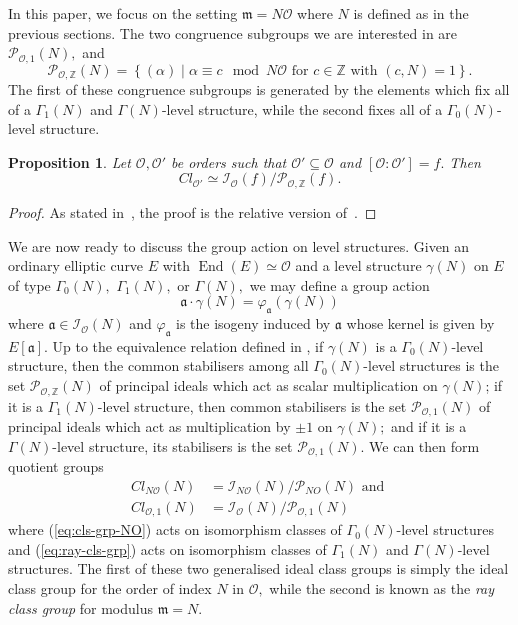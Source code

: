 \documentclass[11pt,a4paper]{amsart}
\theoremstyle{plain}
\newtheorem{prop}[thm]{Proposition}
\theoremstyle{definition}
\theoremstyle{remark}
\DeclareMathOperator{\Endo}{End}
\begin{document}
In this paper, we focus on the setting $\mathfrak{m} = N\mathcal{O}$ where $N$ is defined as in the previous sections. The two congruence subgroups we are interested in are $\mathcal{P}_{\mathcal{O},1}(N),$ and
\[
\mathcal{P}_{\mathcal{O},\mathbb{Z}}(N) = \left\{ (\alpha) \mid \alpha \equiv c \mod N\mathcal{O} \text{ for } c \in \mathbb{Z} \text{ with } (c, N) = 1 \right\}.
\]
The first of these congruence subgroups is generated by the elements which fix all of a $\Gamma_1(N)$ and $\Gamma(N)$-level structure, while the second fixes all of a $\Gamma_0(N)$-level structure.

\begin{prop}\label{prop:cong-subgroup-integers}
  Let $\mathcal{O}, \mathcal{O}'$ be orders such that $\mathcal{O}' \subseteq \mathcal{O}$ and $[\mathcal{O}:\mathcal{O}'] = f.$ Then
  \[
    Cl_{\mathcal{O}'} \simeq \mathcal{I}_{\mathcal{O}}(f)/\mathcal{P}_{\mathcal{O},\mathbb{Z}}(f).
  \]
\end{prop}
\begin{proof}
  As stated in~\cite[Thm.~2.3.1]{class-group-action-oriented}, the proof is the relative version of~\cite[Prop.~7.22]{cox}.
\end{proof}

We are now ready to discuss the group action on level structures. Given an ordinary elliptic curve $E$ with $\Endo(E) \simeq \mathcal{O}$ and a level structure $\gamma(N)$ on $E$ of type $\Gamma_0(N),$ $\Gamma_1(N),$ or $\Gamma(N),$ we may define a group action
\[
  \mathfrak{a} \cdot \gamma(N) = \varphi_{\mathfrak{a}}(\gamma(N))
\]
where $\mathfrak{a} \in \mathcal{I}_{\mathcal{O}}(N)$ and $\varphi_{\mathfrak{a}}$ is the isogeny induced by $\mathfrak{a}$ whose kernel is given by $E[\mathfrak{a}].$ Up to the equivalence relation defined in , if $\gamma(N)$ is a $\Gamma_0(N)$-level structure, then the common stabilisers among all $\Gamma_0(N)$-level structures is the set $\mathcal{P}_{\mathcal{O},\mathbb{Z}}(N)$ of principal ideals which act as scalar multiplication on $\gamma(N)$; if it is a $\Gamma_1(N)$-level structure, then common stabilisers is the set $\mathcal{P}_{\mathcal{O},1}(N)$ of principal ideals which act as multiplication by $\pm 1$ on $\gamma(N);$ and if it is a $\Gamma(N)$-level structure, its stabilisers is the set $\mathcal{P}_{\mathcal{O},1}(N)$. We can then form quotient groups
\begin{align}
  Cl_{N\mathcal{O}}(N) &= \mathcal{I}_{N\mathcal{O}}(N) / \mathcal{P}_{NO}(N) \text{ and } \label{eq:cls-grp-NO}\\
  Cl_{\mathcal{O},1}(N) &= \mathcal{I}_{\mathcal{O}}(N) / \mathcal{P}_{\mathcal{O},1}(N) \label{eq:ray-cls-grp}
\end{align}
where (\eqref{eq:cls-grp-NO}) acts on isomorphism classes of $\Gamma_0(N)$-level structures and (\eqref{eq:ray-cls-grp}) acts on isomorphism classes of $\Gamma_1(N)$ and $\Gamma(N)$-level structures. The first of these two generalised ideal class groups is simply the ideal class group for the order of index $N$ in $\mathcal{O},$ while the second is known as the \emph{ray class group} for modulus $\mathfrak{m} = N.$
\end{document}
